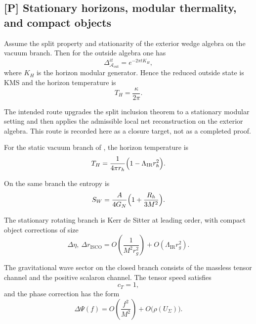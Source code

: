 \subsection{[P] Stationary horizons, modular thermality, and compact objects}

\begin{conjecture}
\label{thm:modular_horizon_thermality}
Assume the split property and stationarity of the exterior wedge algebra on the vacuum branch. Then
for the outside algebra one has
\[
\Delta_{\mathcal A_{\mathrm{out}}}^{it}=e^{-2\pi t K_H},
\]
where \(K_H\) is the horizon modular generator. Hence the reduced outside state is KMS and the
horizon temperature is
\[
T_H=\frac{\kappa}{2\pi}.
\]
\end{conjecture}

\begin{remark}
The intended route upgrades the split inclusion theorem  to a
stationary modular setting and then applies the admissible local net reconstruction on the exterior
algebra. This route is recorded here as a closure target, not as a completed proof.
\end{remark}

\begin{conjecture}
\label{cor:hawking_temperature_stationary_branch}
For the static vacuum branch of
, the horizon temperature is
\[
T_H=\frac{1}{4\pi r_h}\Bigl(1-\Lambda_{\mathrm{IR}}r_h^2\Bigr).
\]
\end{conjecture}

\begin{conjecture}
\label{prop:wald_entropy_scalaron_branch}
On the same branch the entropy is
\[
S_W=\frac{A}{4G_N}\Bigl(1+\frac{R_h}{3M^2}\Bigr).
\]
\end{conjecture}

\begin{conjecture}
\label{prop:kerr_compact_object_corrections}
The stationary rotating branch is Kerr de Sitter at leading order, with compact object corrections
of size
\[
\Delta\eta,\ \Delta r_{\mathrm{ISCO}}
=
O\!\left(\frac{1}{M^2r_g^2}\right)+O(\Lambda_{\mathrm{IR}}r_g^2).
\]
\end{conjecture}

\begin{conjecture}
\label{thm:tensor_scalaron_wave_channel_closure}
The gravitational wave sector on the closed branch consists of the massless tensor channel and the
positive scalaron channel. The tensor speed satisfies
\[
c_T=1,
\]
and the phase correction has the form
\[
\Delta\Psi(f)=O\!\left(\frac{f^2}{M^2}\right)+O\bigl(\rho(U_\Sigma)\bigr).
\]
\end{conjecture}

